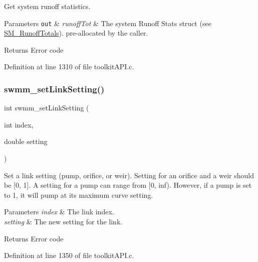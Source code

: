Get system runoff statistics. 


\begin{DoxyParams}[1]{Parameters}
\mbox{\tt out}  & {\em runoff\+Tot} & The system Runoff Stats struct (see \hyperlink{struct_s_m___runoff_totals}{S\+M\+\_\+\+Runoff\+Totals}). pre-\/allocated by the caller. \\
\hline
\end{DoxyParams}
\begin{DoxyReturn}{Returns}
Error code 
\end{DoxyReturn}


Definition at line 1310 of file toolkit\+A\+P\+I.\+c.

\mbox{\label{group__tkfuncs_gab44d2b1c21a6f750b0ce4c48ba16be81}} 
\subsubsection{\texorpdfstring{swmm\+\_\+set\+Link\+Setting()}{swmm\_setLinkSetting()}}
{\footnotesize\ttfamily int swmm\+\_\+set\+Link\+Setting (\begin{DoxyParamCaption}\item[{int}]{index,  }\item[{double}]{setting }\end{DoxyParamCaption})}



Set a link setting (pump, orifice, or weir). Setting for an orifice and a weir should be \mbox{[}0, 1\mbox{]}. A setting for a pump can range from \mbox{[}0, inf). However, if a pump is set to 1, it will pump at its maximum curve setting. 


\begin{DoxyParams}{Parameters}
{\em index} & The link index. \\
\hline
{\em setting} & The new setting for the link. \\
\hline
\end{DoxyParams}
\begin{DoxyReturn}{Returns}
Error code 
\end{DoxyReturn}


Definition at line 1350 of file toolkit\+A\+P\+I.\+c.

\mbox{\label{group__tkfuncs_ga6438a8a45d7712b8b02ba630cd8e1db3}} 
